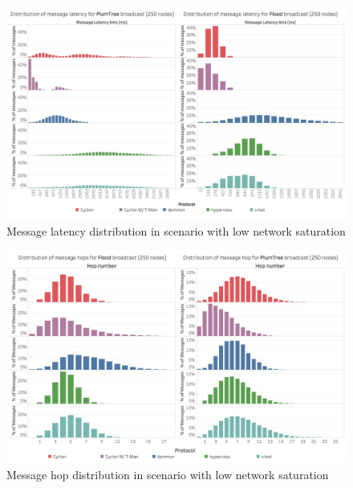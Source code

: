\begin{figure}[htbp]
    \centering
    \includegraphics[width=\linewidth]{Chapters/evaluation/figures/flood/Message latency comparison.jpg}
    \caption{Message latency distribution in scenario with low network saturation}
    \label{fig:overlay_proto_res_msg_diss:0_failures_msg_lat_histogram}
\end{figure}


\begin{figure}[htbp]
    \centering
    \includegraphics[width=\linewidth]{Chapters/evaluation/figures/flood/Message hop distribution.jpg}
    \caption{Message hop distribution in scenario with low network saturation}
    \label{fig:overlay_proto_res_msg_diss:0_failures_msg_hop_histogram}
\end{figure}

